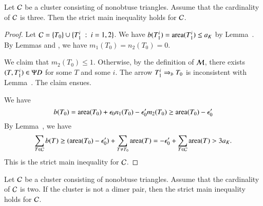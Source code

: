 \begin{lemma}
Let $\mathcal C$ be a cluster consisting of nonobtuse triangles.  Assume
that the cardinality of $\mathcal C$ is three. 
Then the strict main inequality holds for $\mathcal C$.
\end{lemma}

\begin{proof}  
Let $\mathcal C = \{T_0\}\cup \{T_1^i \ :\  i=1,2\}$.  
We have $b(T^i_1) = {\operatorname{area}}(T^i_1)\le a_K$ by Lemma~.
By Lemmas  and , we have $m_1(T_0)=n_2(T_0)=0$.

We claim that $m_2(T_0)\le 1$.  Otherwise, by the definition of $\mathcal M$, there exists
$(T,T^i_1)\in\Psi D$ for some $T$ and some $i$.  The arrow $T^i_1\Rightarrow_{b} T_0$ is inconsistent
with Lemma~.  The claim ensues.

We have
\[
b(T_0) = {\operatorname{area}}(T_0) + \epsilon_0 n_1(T_0) - \epsilon_0' m_2(T_0) \ge {\operatorname{area}}(T_0) - \epsilon_0'
\]
By Lemma~, we have
\[
\sum_{T\in\mathcal C} b(T) \ge ({\operatorname{area}}(T_0) - \epsilon_0') + \sum_{T\ne T_0} {\operatorname{area}}(T) = -\epsilon_0'+ \sum_{T\in\mathcal C} {\operatorname{area}}(T) > 3a_K.
\]
This is the strict main inequality for $\mathcal C$.
\end{proof}

\begin{lemma} Let $\mathcal C$ be a cluster consisting of nonobtuse triangles.  Assume
that the cardinality of $\mathcal C$ is two.  If the cluster is not a dimer pair, 
then the strict main inequality holds for $\mathcal C$.
\end{lemma}

